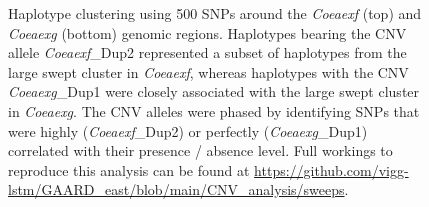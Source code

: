 \documentclass[a4paper,12pt]{article}
\begin{document}
\begin{figure}[h]
	\vskip 0.4cm
	\caption{\footnotesize Haplotype clustering using 500 SNPs around the \textit{Coeaexf} (top) and \textit{Coeaexg} (bottom) genomic regions. Haplotypes bearing the CNV allele \textit{Coeaexf}\_Dup2 represented a subset of haplotypes from the large swept cluster in \textit{Coeaexf}, whereas haplotypes with the CNV \textit{Coeaexg}\_Dup1 were closely associated with the large swept cluster in \textit{Coeaexg}. The CNV alleles were phased by identifying SNPs that were highly (\textit{Coeaexf}\_Dup2) or perfectly (\textit{Coeaexg}\_Dup1) correlated with their presence / absence level. Full workings to reproduce this analysis can be found at \url{https://github.com/vigg-lstm/GAARD\_east/blob/main/CNV\_analysis/sweeps}.}
	\label{FigS4}
\end{figure}


\clearpage
\end{document}
